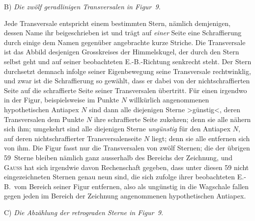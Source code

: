 \documentclass[12pt,a4paper]{article}
\theoremstyle{plain}
\theoremstyle{definition}
\theoremstyle{remark}
\begin{document}
\begin{small}
B) \textit{Die zw\"olf geradlinigen Transversalen in Figur~9.}

Jede Transversale entspricht einem bestimmten Stern, n\"amlich demjenigen, dessen
Name ihr beigeschrieben ist und tr\"agt auf \textit{einer} Seite eine Schraffierung
durch einige dem Namen gegen\"uber angebrachte kurze Striche. Die Transversale
ist das Abbild desjenigen Grosskreises der Himmelskugel, der durch den Stern
selbst geht und auf seiner beobachteten E.-B.-Richtung senkrecht steht. Der Stern
durchsetzt demnach infolge seiner Eigenbewegung seine Transversale rechtwinklig,
und zwar ist die Schraffierung so gew\"ahlt, dass er dabei von der nichtschraffierten
Seite auf die schraffierte Seite seiner Transversalen \"ubertritt. F\"ur einen irgendwo
in der Figur, beispielsweise im Punkte $N$ willk\"urlich angenommenen hypothetischen
Antiapex $N$ sind dann alle diejenigen Sterne \textgreater{}g\"unstig\textless{}, deren Transversalen
dem Punkte $N$ ihre schraffierte Seite zukehren; denn sie alle n\"ahern sich ihm;
umgekehrt sind alle diejenigen Sterne \textit{ung\"unstig} f\"ur den Antiapex $N$, auf deren
nichtschraffierter Transversalenseite $N$ liegt; denn sie alle entfernen sich von
ihm. Die Figur fasst nur die Transversalen von zw\"olf Sternen; die der \"ubrigen
59~Sterne bleiben n\"amlich ganz ausserhalb des Bereichs der Zeichnung, und
\textsc{Gauss} hat sich irgendwie davon Rechenschaft gegeben, dass unter diesen 59
nicht eingezeichneten Sternen genau neun sind, die sich zufolge ihrer beobachteten
E.-B.~vom Bereich seiner Figur entfernen, also als ung\"unstig in die Wagschale
fallen gegen jeden im Bereich der Zeichnung angenommenen hypothetischen Antiapex.

C) \textit{Die Abz\"ahlung der retrograden Sterne in Figur~9.}


\end{small}
\end{document}
